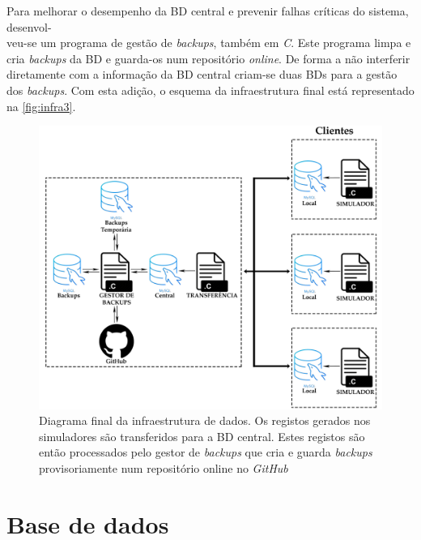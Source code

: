 \documentclass[11pt,twoside,a4paper]{report}
\begin{document}
Para melhorar o desempenho da BD central e prevenir falhas críticas do sistema, desenvol-\\veu-se um programa de gestão de \textit{backups}, também em \textit{C}. Este programa limpa e cria \textit{backups} da BD e guarda-os num repositório \textit{online}. De forma a não interferir diretamente com a informação da BD central criam-se duas BDs para a gestão dos \textit{backups}. Com esta adição, o esquema da infraestrutura final está representado na \autoref{fig:infra3}.\par 
\begin{figure}
	\begin{center}
		\includegraphics[width=1\textwidth]{Esquema_Projeto_6} %
		\caption[Diagrama final da infraestrutura]{Diagrama final da infraestrutura de dados. Os registos gerados nos simuladores são transferidos para a BD central. Estes registos são então processados pelo gestor de \textit{backups} que cria e guarda \textit{backups} provisoriamente num repositório online no \textit{GitHub}}
		\label{fig:infra3}
		\end{center}
\end{figure}

\section{Base de dados}
\end{document}

